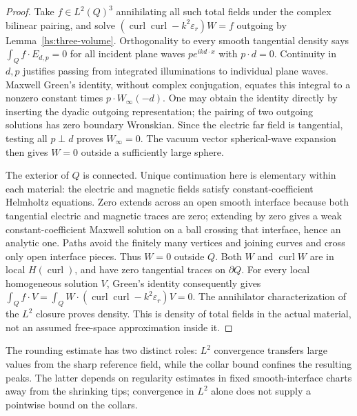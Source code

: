 \begin{proof}
Take $f\in L^2(Q)^3$ annihilating all such total fields under the
complex bilinear pairing, and solve
$(\operatorname{curl}\operatorname{curl}-k^2\varepsilon_r)W=f$
outgoing by Lemma~\ref{hs:three-volume}.  Orthogonality to every
smooth tangential density says
$\int_Q f\cdot E_{d,p}=0$ for all incident plane waves
$p e^{ikd\cdot x}$ with $p\cdot d=0$.  Continuity in $d,p$
justifies passing from integrated illuminations to individual
plane waves.  Maxwell Green's identity, without complex conjugation,
equates this integral to a nonzero constant times
$p\cdot W_\infty(-d)$.  One may obtain the identity directly by
inserting the dyadic outgoing representation; the pairing of two
outgoing solutions has zero boundary Wronskian.  Since the electric
far field is tangential, testing all $p\perp d$ proves
$W_\infty=0$.  The vacuum vector spherical-wave expansion then
gives $W=0$ outside a sufficiently large sphere.

The exterior of $Q$ is connected.  Unique continuation here is
elementary within each material: the electric and magnetic fields
satisfy constant-coefficient Helmholtz equations.  Zero extends
across an open smooth interface because both tangential electric
and magnetic traces are zero; extending by zero gives a weak
constant-coefficient Maxwell solution on a ball crossing that
interface, hence an analytic one.  Paths avoid the finitely many
vertices and joining curves and cross only open interface pieces.
Thus $W=0$ outside $Q$.
Both $W$ and $\operatorname{curl}W$ are in local
$H(\operatorname{curl})$, and have zero tangential traces on
$\partial Q$.  For every local homogeneous solution $V$, Green's
identity consequently gives
$\int_Q f\cdot V=\int_QW\cdot
(\operatorname{curl}\operatorname{curl}-k^2\varepsilon_r)V=0$.
The annihilator characterization of the $L^2$ closure proves density.
This is density of total fields in the actual material, not an
assumed free-space approximation inside it.
\end{proof}

The rounding estimate has two distinct roles: $L^2$ convergence transfers
large values from the sharp reference field, while the collar bound confines
the resulting peaks. The latter depends on regularity estimates in fixed
smooth-interface charts away from the shrinking tips; convergence in
$L^2$ alone does not supply a pointwise bound on the collars.

